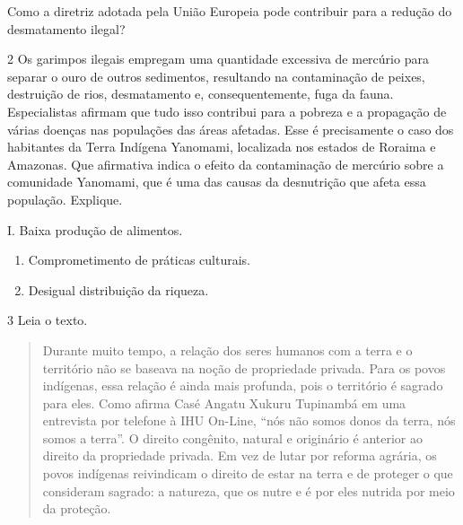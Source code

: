 
Como a diretriz adotada pela União Europeia pode contribuir para a
redução do desmatamento ilegal?


\num{2} Os garimpos ilegais empregam uma quantidade excessiva de
mercúrio para separar o ouro de outros sedimentos, resultando na
contaminação de peixes, destruição de rios, desmatamento e,
consequentemente, fuga da fauna. Especialistas afirmam que tudo isso
contribui para a pobreza e a propagação de várias doenças nas populações
das áreas afetadas. Esse é precisamente o caso dos habitantes da Terra
Indígena Yanomami, localizada nos estados de Roraima e Amazonas. Que
afirmativa indica o efeito da contaminação de mercúrio sobre a
comunidade Yanomami, que é uma das causas da desnutrição que afeta essa
população. Explique.

I. Baixa produção de alimentos.

\begin{enumerate}
\def\labelenumi{\Roman{enumi}.}
\setcounter{enumi}{1}
\item
  Comprometimento de práticas culturais.
\item
  Desigual distribuição da riqueza.
\end{enumerate}


\num{3} Leia o texto.

\begin{quote}
Durante muito tempo, a relação dos seres humanos com a terra e o
território não se baseava na noção de propriedade privada. Para os povos
indígenas, essa relação é ainda mais profunda, pois o território é
sagrado para eles. Como afirma Casé Angatu Xukuru Tupinambá em uma
entrevista por telefone à IHU On-Line, ``nós não somos donos da terra,
nós somos a terra''. O direito congênito, natural e originário é
anterior ao direito da propriedade privada. Em vez de lutar por reforma
agrária, os povos indígenas reivindicam o direito de estar na terra e de
proteger o que consideram sagrado: a natureza, que os nutre e é por eles
nutrida por meio da proteção.
\end{quote}

